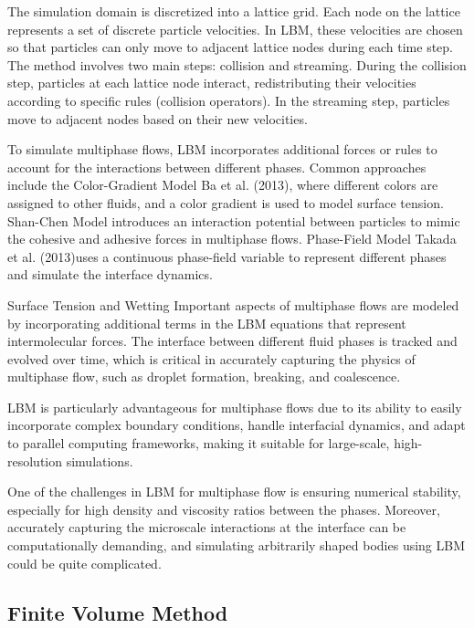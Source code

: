The simulation domain is discretized into a lattice grid. Each node on the lattice represents a set of discrete particle velocities. In LBM, these velocities are chosen so that particles can only move to adjacent lattice nodes during each time step. The method involves two main steps: collision and streaming. During the collision step, particles at each lattice node interact, redistributing their velocities according to specific rules (collision operators). In the streaming step, particles move to adjacent nodes based on their new velocities.

To simulate multiphase flows, LBM incorporates additional forces or rules to account for the interactions between different phases. Common approaches include the Color-Gradient Model Ba et al. (2013)\cite{ba2013color}, where different colors are assigned to other fluids, and a color gradient is used to model surface tension. Shan-Chen Model \cite{huang2011forcing} introduces an interaction potential between particles to mimic the cohesive and adhesive forces in multiphase flows. Phase-Field Model Takada et al. (2013)\cite{takada2013phase}uses a continuous phase-field variable to represent different phases and simulate the interface dynamics.

Surface Tension and Wetting Important aspects of multiphase flows are modeled by incorporating additional terms in the LBM equations that represent intermolecular forces. The interface between different fluid phases is tracked and evolved over time, which is critical in accurately capturing the physics of multiphase flow, such as droplet formation, breaking, and coalescence.

LBM is particularly advantageous for multiphase flows due to its ability to easily incorporate complex boundary conditions, handle interfacial dynamics, and adapt to parallel computing frameworks, making it suitable for large-scale, high-resolution simulations.

One of the challenges in LBM for multiphase flow is ensuring numerical stability, especially for high density and viscosity ratios between the phases. Moreover, accurately capturing the microscale interactions at the interface can be computationally demanding, and simulating arbitrarily shaped bodies using LBM could be quite complicated.

\subsection{Finite Volume Method}

